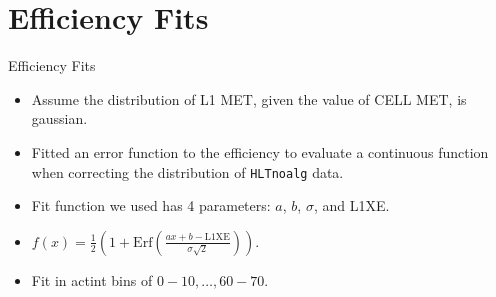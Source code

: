 \documentclass[]{beamer}
\begin{document}
\section{Efficiency Fits}
\begin{frame}{Efficiency Fits}
		\begin{itemize}
				\item Assume the distribution of L1 MET, given the value of CELL MET, is gaussian. 
				\item Fitted an error function to the efficiency to evaluate a continuous function when correcting the distribution of \texttt{HLTnoalg} data.
				\item Fit function we used has 4 parameters: $a$, $b$, $\sigma$, and L1XE.
				\item $f(x)=\frac{1}{2}\left( 1+\mathrm{Erf}\left( \frac{ax+b-\mathrm{L1XE}}{\sigma \sqrt{2}} \right) \right)$.
				\item Fit in actint bins of $0-10,\ldots, 60-70$.
		\end{itemize}
\end{frame}
\begin{frame}
\end{frame}
\begin{frame}
\end{frame}
\begin{frame}
\end{frame}
\end{document}
